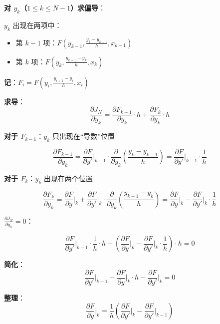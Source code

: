 \documentclass[12pt, a4paper]{ctexart}
\begin{document}
\begin{blackboard}[对内部点求导]

\textbf{对 $y_k$（$1 \leq k \leq N-1$）求偏导}：

$y_k$ 出现在两项中：
\begin{itemize}
    \item 第 $k-1$ 项：$F\left( y_{k-1}, \frac{y_k - y_{k-1}}{h}, x_{k-1} \right)$
    \item 第 $k$ 项：$F\left( y_k, \frac{y_{k+1} - y_k}{h}, x_k \right)$
\end{itemize}

\textbf{记}：$F_i = F\left( y_i, \frac{y_{i+1} - y_i}{h}, x_i \right)$

\textbf{求导}：
\[
\frac{\partial J_N}{\partial y_k} = \frac{\partial F_{k-1}}{\partial y_k} \cdot h + \frac{\partial F_k}{\partial y_k} \cdot h
\]

\end{blackboard}

\begin{blackboard}[展开偏导数]

\textbf{对于 $F_{k-1}$}：$y_k$ 只出现在``导数''位置

\[
\frac{\partial F_{k-1}}{\partial y_k} = \frac{\partial F}{\partial y'}\bigg|_{k-1} \cdot \frac{\partial}{\partial y_k}\left( \frac{y_k - y_{k-1}}{h} \right) = \frac{\partial F}{\partial y'}\bigg|_{k-1} \cdot \frac{1}{h}
\]

\textbf{对于 $F_k$}：$y_k$ 出现在两个位置

\[
\frac{\partial F_k}{\partial y_k} = \frac{\partial F}{\partial y}\bigg|_k + \frac{\partial F}{\partial y'}\bigg|_k \cdot \frac{\partial}{\partial y_k}\left( \frac{y_{k+1} - y_k}{h} \right) = \frac{\partial F}{\partial y}\bigg|_k - \frac{\partial F}{\partial y'}\bigg|_k \cdot \frac{1}{h}
\]

\end{blackboard}

\begin{blackboard}[极值条件]

\textbf{$\frac{\partial J_N}{\partial y_k} = 0$}：

\[
\frac{\partial F}{\partial y'}\bigg|_{k-1} \cdot \frac{1}{h} \cdot h + \left( \frac{\partial F}{\partial y}\bigg|_k - \frac{\partial F}{\partial y'}\bigg|_k \cdot \frac{1}{h} \right) \cdot h = 0
\]

\textbf{简化}：
\[
\frac{\partial F}{\partial y'}\bigg|_{k-1} + \frac{\partial F}{\partial y}\bigg|_k \cdot h - \frac{\partial F}{\partial y'}\bigg|_k = 0
\]

\textbf{整理}：
\[
\frac{\partial F}{\partial y}\bigg|_k = \frac{1}{h}\left( \frac{\partial F}{\partial y'}\bigg|_k - \frac{\partial F}{\partial y'}\bigg|_{k-1} \right)
\]

\end{blackboard}
\end{document}
